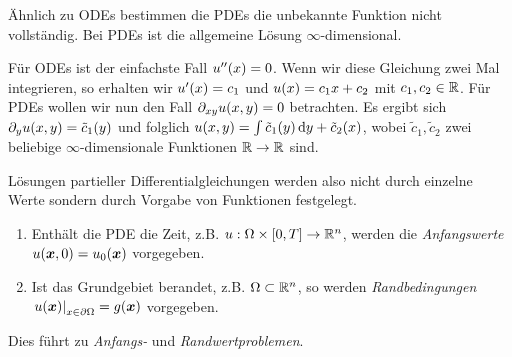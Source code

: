 \documentclass{lecture}
\begin{document}
    Ähnlich zu ODEs bestimmen die PDEs die unbekannte Funktion nicht vollständig.
    Bei PDEs ist die allgemeine Lösung \(\infty\)-dimensional.
    \begin{example}
        Für ODEs ist der einfachste Fall \(u''\parentheses*{x} = 0\).
        Wenn wir diese Gleichung zwei Mal integrieren, so erhalten wir \(u'\parentheses*{x} = c_1\) und \(u\parentheses*{x} = c_1 x + c_2\) mit \(c_1, c_2 \in \R\).
        Für PDEs wollen wir nun den Fall \(\partial_{xy}u\parentheses*{x, y} = 0\) betrachten.
        Es ergibt sich \(\partial_y u\parentheses*{x, y} = \tilde{c}_1\parentheses*{y}\) und folglich \(u\parentheses*{x, y} = \int \tilde{c}_1\parentheses*{y}\d y + \tilde{c}_2\parentheses*{x}\), wobei \(\tilde{c}_1, \tilde{c}_2\) zwei beliebige \(\infty\)-dimensionale Funktionen \(\R \to \R\) sind.
    \end{example}
    Lösungen partieller Differentialgleichungen werden also nicht durch einzelne Werte sondern durch Vorgabe von Funktionen festgelegt.
    \begin{definition}
        \begin{enumerate}
            \item Enthält die PDE die Zeit, z.B. \(u: \Omega \times \brackets*{0, T} \to \R^n\), werden die \emph{Anfangswerte} \(u\parentheses*{\bm{x}, 0} = u_0\parentheses*{\bm{x}}\) vorgegeben.
            \item Ist das Grundgebiet berandet, z.B. \(\Omega \subset \R^n\), so werden \emph{Randbedingungen} \(\left.u\parentheses*{\bm{x}}\right|_{x \in \partial\Omega} = g\parentheses*{\bm{x}}\) vorgegeben.
        \end{enumerate}
        Dies führt zu \emph{Anfangs-} und \emph{Randwertproblemen}.
    \end{definition}
\end{document}
